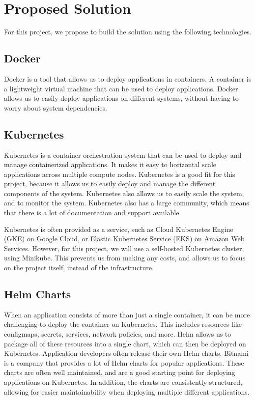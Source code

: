 \documentclass{article}
\begin{document}
    \section{Proposed Solution}
    For this project, we propose to build the solution using the following technologies.

    \subsection{Docker}
    Docker is a tool that allows us to deploy applications in containers.
    A container is a lightweight virtual machine that can be used to deploy applications.
    Docker allows us to easily deploy applications on different systems, without having to worry about system dependencies.

    \subsection{Kubernetes}
    Kubernetes is a container orchestration system that can be used to deploy and manage containerized applications.
    It makes it easy to horizontal scale applications across multiple compute nodes.
    Kubernetes is a good fit for this project, because it allows us to easily deploy and manage the different components of the system.
    Kubernetes also allows us to easily scale the system, and to monitor the system.
    Kubernetes also has a large community, which means that there is a lot of documentation and support available.

    Kubernetes is often provided as a service, such as Cloud Kubernetes Engine (GKE) on Google Cloud, or Elastic Kubernetes Service (EKS) on Amazon Web Services.
    However, for this project, we will use a self-hosted Kubernetes cluster, using Minikube.
    This prevents us from making any costs, and allows us to focus on the project itself, instead of the infrastructure.

    \subsection{Helm Charts}
    When an application consists of more than just a single container, it can be more challenging to deploy the container on Kubernetes.
    This includes resources like configmaps, secrets, services, network policies, and more.
    Helm allows us to package all of these resources into a single chart, which can then be deployed on Kubernetes.
    Application developers often release their own Helm charts.
    Bitnami is a company that provides a lot of Helm charts for popular applications.
    These charts are often well maintained, and are a good starting point for deploying applications on Kubernetes.
    In addition, the charts are consistently structured, allowing for easier maintainability when deploying multiple different applications.
\end{document}

